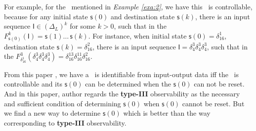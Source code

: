\begin{example}
For example, for the \BCN\ mentioned in {\em Example \ref{exa:2}}, we have this \BCN\ is controllable, because for any initial state $\mathsf{s}(0)$ and destination state $\mathsf{s}(k)$, there is an input sequence $\mathsf{I}\in(\Delta_L)^k$ for some $k>0$, such that in the $F^k_{\mathsf{s}(0)}(\mathsf{I})=\mathsf{s}(1) \ldots\, \mathsf{s}(k)$. For instance, when initial state $\mathsf{s}(0)= \delta_{16}^{1}$, destination state $\mathsf{s}(k)=\delta_{16}^{2}$, there is an input sequence $\mathsf{I}=\delta_{4}^{3}\delta_{4}^{3}\delta_{4}^{3}$, such that in the $F^3_{\delta_{16}^{1}}(\delta_{4}^{3}\delta_{4}^{3}\delta_{4}^{3})=\delta_{16}^{13}\delta_{16}^{11}\delta_{16}^{2}$.
\label{exa:12}
\end{example}  

From this paper \cite{Cheng2011Identification}, we have a \BCN\ is identifiable from input-output data iff the \BCN\ is controllable and its $\mathsf{s}(0)$ can be determined  when the $\mathsf{s}(0)$ can not be reset. And in this paper, author regards the {\bf type-III} observability as the necessary and sufficient condition of determining $\mathsf{s}(0)$ when $\mathsf{s}(0)$ cannot be reset. But we find a new way to determine $\mathsf{s}(0)$ which is better than the way corresponding to {\bf type-III} observability. 



